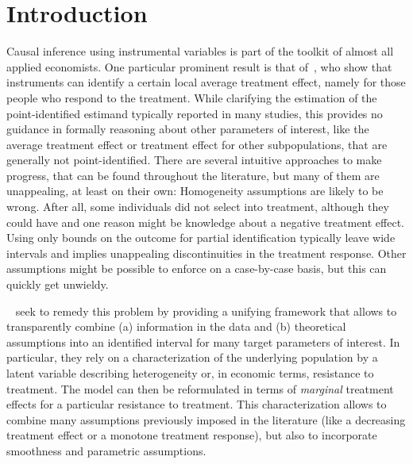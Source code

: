 \documentclass[12pt,a4paper,english]{article} %
\numberwithin{equation}{section}
\theoremstyle{definition}
\theoremstyle{remark}
\theoremstyle{plain}
\begin{document}
\section{Introduction}\label{sec:introduction}
Causal inference using instrumental variables is part of the toolkit of almost all applied economists.
One particular prominent result is that of~\cite{imbens_angrist1994ecma}, who show that instruments can identify a certain local average treatment effect, namely for those people who respond to the treatment.
While clarifying the estimation of the point-identified estimand typically reported in many studies, this provides no guidance in formally reasoning about other parameters of interest, like the average treatment effect or treatment effect for other subpopulations, that are generally not point-identified.
There are several intuitive approaches to make progress, that can be found throughout the literature, but many of them are unappealing, at least on their own:
Homogeneity assumptions are likely to be wrong. After all, some individuals did not select into treatment, although they could have and one reason might be knowledge about a negative treatment effect.
Using only bounds on the outcome for partial identification typically leave wide intervals and implies unappealing discontinuities in the treatment response.
Other assumptions might be possible to enforce on a case-by-case basis, but this can quickly get unwieldy.

~\cite{mogstad2018using} seek to remedy this problem by providing a unifying framework that allows to transparently combine
(a) information in the data and (b) theoretical assumptions into an identified interval for many target parameters of interest.
In particular, they rely on a characterization of the underlying population by a latent variable describing heterogeneity or, in economic terms, resistance to treatment.
The model can then be reformulated in terms of \textit{marginal} treatment effects for a particular resistance to treatment.
This characterization allows to combine many assumptions previously imposed in the literature (like a decreasing treatment effect or a monotone treatment response), but also to incorporate smoothness and parametric assumptions.
\end{document}
